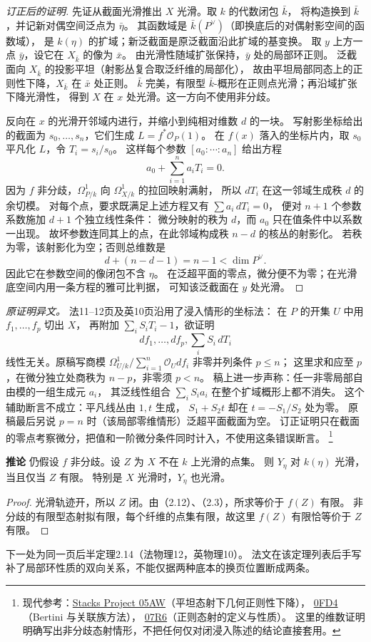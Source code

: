 \documentclass[openany,fontset=fandol]{ctexbook}
\newcommand{\OO}{\mathcal O}
\newcommand{\tagitem}[2]{\par\medskip\noindent\textbf{#1\quad #2}\enspace}
\begin{document}
\begin{proof}[订正后的证明]
先证从截面光滑推出 $X$ 光滑。取 $k$ 的代数闭包 $\bar k$，
将构造换到 $\bar k$，并记新对偶空间泛点为 $\bar\eta$。
其函数域是 $\bar k(P^\vee)$（即换底后的对偶射影空间的函数域），
是 $k(\eta)$ 的扩域；新泛截面是原泛截面沿此扩域的基变换。
取 $y$ 上方一点 $\bar y$，设它在 $X_{\bar k}$ 的像为 $\bar x$。
由光滑性随域扩张保持，$\bar y$ 处的局部环正则。
泛截面向 $X_{\bar k}$ 的投影平坦（射影丛复合取泛纤维的局部化），
故由平坦局部同态上的正则性下降，$X_{\bar k}$ 在 $\bar x$ 处正则。
$\bar k$ 完美，有限型 $\bar k$-概形在正则点光滑；再沿域扩张下降光滑性，
得到 $X$ 在 $x$ 处光滑。这一方向不使用非分歧。

反向在 $x$ 的光滑开邻域内进行，并缩小到纯相对维数 $d$ 的一块。
写射影坐标给出的截面为 $s_0,\ldots,s_n$，它们生成 $L=f^*\OO_P(1)$。
在 $f(x)$ 落入的坐标片内，取 $s_0$ 平凡化 $L$，令 $T_i=s_i/s_0$。
这样每个参数 $[a_0:\cdots:a_n]$ 给出方程
\[
 a_0+\sum_{i=1}^n a_i T_i=0.
\]
因为 $f$ 非分歧，$\Omega^1_{P/k}$ 向 $\Omega^1_{X/k}$ 的拉回映射满射，
所以 $dT_i$ 在这一邻域生成秩 $d$ 的余切模。
对每个点，要求既满足上述方程又有 $\sum a_i\,dT_i=0$，
便对 $n+1$ 个参数系数施加 $d+1$ 个独立线性条件：
微分映射的秩为 $d$，而 $a_0$ 只在值条件中以系数一出现。
故坏参数连同其上的点，在此邻域构成秩 $n-d$ 的核丛的射影化。
若秩为零，该射影化为空；否则总维数是
\[
 d+(n-d-1)=n-1<\dim P^\vee .
\]
因此它在参数空间的像闭包不含 $\eta$。
在泛超平面的零点，微分便不为零；在光滑底空间内用一条方程的雅可比判据，
可知该泛截面在 $y$ 处光滑。
\end{proof}

\noindent\emph{原证明异文。}
法11--12页及英10页沿用了浸入情形的坐标法：
在 $P$ 的开集 $U$ 中用 $f_1,\ldots,f_p$ 切出 $X$，
再附加 $\sum_iS_iT_i-1$，欲证明
\[
 df_1,\ldots,df_p,\sum_iS_i\,dT_i
\]
线性无关。原稿写商模
$\Omega^1_{U/k}/\sum_{i=1}^n\OO_Udf_i$ 非零并列条件 $p\le n$；
这里求和应至 $p$，在微分独立处商秩为 $n-p$，非零须 $p<n$。
稿上进一步声称：任一非零局部自由模的一组生成元 $a_i$，
其泛线性组合 $\sum_i S_i a_i$ 在整个扩域概形上都不消失。
这个辅助断言不成立：平凡线丛由 $1,t$ 生成，
$S_1+S_2t$ 却在 $t=-S_1/S_2$ 处为零。
原稿最后另说 $p=n$ 时（该局部零维情形）泛超平面截面为空。
订正证明只在截面的零点考察微分，把值和一阶微分条件同时计入，不使用这条错误断言。%
\footnote{现代参考：\href{https://stacks.math.columbia.edu/tag/05AW}{Stacks Project 05AW}（平坦态射下几何正则性下降），
\href{https://stacks.math.columbia.edu/tag/0FD4}{0FD4}（Bertini 与关联族方法），
\href{https://stacks.math.columbia.edu/tag/07R6}{07R6}（正则态射的定义与性质）。
这里的维数证明明确写出非分歧态射情形，不把任何仅对闭浸入陈述的结论直接套用。}

\tagitem{推论}{2.13}
仍假设 $f$ 非分歧。设 $Z$ 为 $X$ 不在 $k$ 上光滑的点集。
则 $Y_\eta$ 对 $k(\eta)$ 光滑，当且仅当 $Z$ 有限。
特别是 $X$ 光滑时，$Y_\eta$ 也光滑。
\begin{proof}
光滑轨迹开，所以 $Z$ 闭。由（2.12）、（2.3），所求等价于 $f(Z)$ 有限。
非分歧的有限型态射拟有限，每个纤维的点集有限，故这里 $f(Z)$ 有限恰等价于 $Z$ 有限。
\end{proof}
\noindent 下一处为同一页后半定理2.14（法物理12，英物理10）。
法文在该定理列表后手写补了局部环性质的双向关系，不能仅据两种底本的换页位置断成两条。
\end{document}
